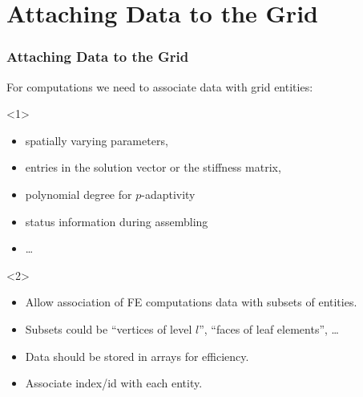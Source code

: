 \documentclass[ignorenonframetext,11pt]{beamer}
\theoremstyle{definition}
\begin{document}

\section{Attaching Data to the Grid}
\begin{frame} \frametitle{Attaching Data to the Grid}

  For computations we need to associate data with grid entities:

  \begin{onlyenv}<1>
  \begin{itemize}
  \item spatially varying parameters,
  \item entries in the solution vector or the stiffness matrix,
  \item polynomial degree for $p$-adaptivity
  \item status information during assembling
  \item \ldots
  \end{itemize}
  \end{onlyenv}

  \begin{onlyenv}<2>
  \begin{itemize}
  \item Allow association of FE computations data with subsets of entities.
  \item Subsets could be ``vertices of level $l$'', ``faces of leaf
    elements'', \ldots
  \item Data should be stored in arrays for efficiency.
  \item Associate index/id with each entity.
  \end{itemize}
  \end{onlyenv}

\end{frame}
\end{document}
